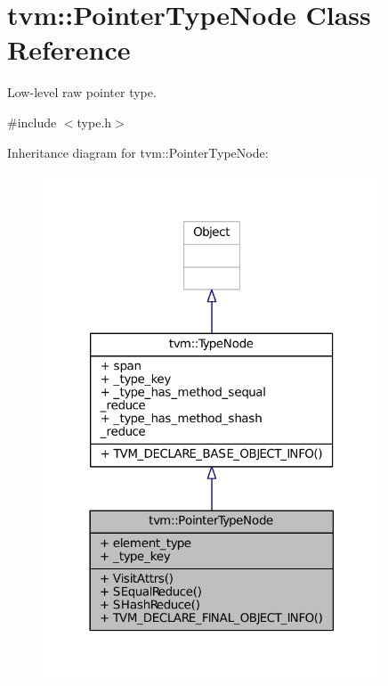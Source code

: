 \hypertarget{classtvm_1_1PointerTypeNode}{}\section{tvm\+:\+:Pointer\+Type\+Node Class Reference}
\label{classtvm_1_1PointerTypeNode}


Low-\/level raw pointer type.  




{\ttfamily \#include $<$type.\+h$>$}



Inheritance diagram for tvm\+:\+:Pointer\+Type\+Node\+:
\nopagebreak
\begin{figure}[H]
\begin{center}
\leavevmode
\includegraphics[width=285pt]{classtvm_1_1PointerTypeNode__inherit__graph}
\end{center}
\end{figure}


